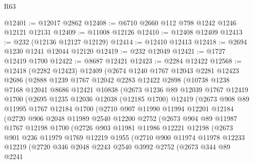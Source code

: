 \begin{lexlean}{R63}
\begin{coremodule}
@12401 := @12017 @2862
@12408 := @6710 @2660 @112 @798 @1242 @1246 @12121 @12131
@12409 := @11008 @12126
@12410 := @12408 @12409
@12413 := @232 (@12136 @12127 @12129)
@12414 := @12410 @12413
@12418 := @2694 @1230 @1241 @12044 @12120
@12419 := @232 @12049
@12421 := @1727 @12419 @1700
@12422 := @8687 @12421
@12423 := @2284 @12422
@12568 := @12418
    (@2282 @12423)
    @12409
    (@2674
      @1240
      @1767
      @12043
      @2281
      @12423
      @2686
      (@2888
        @1239
        @1767
        @12042
        @2283
        @12422
        @2898
        (@10738
          @1238
          @7168
          @12041
          @8686
          @12421
          @10838
          (@2673
            @1236
            @89
            @12039
            @1767
            @12419
            @1700
            (@2695
              @1235
              @12036
              @12038
              (@12185 @1700)
              @12419
              (@2673
                @908
                @89
                @11995
                @1767
                @12184
                @1700
                (@2710
                  @907
                  @11990
                  @11994
                  @12201
                  @12184
                  (@2720
                    @906
                    @2048
                    @11989
                    @2540
                    @12200
                    @2752
                    (@2673
                      @904
                      @89
                      @11987
                      @1767
                      @12198
                      @1700
                      (@2726
                        @903
                        @11981
                        @11986
                        @12221
                        @12198
                        (@2673
                          @901
                          @236
                          @11979
                          @1769
                          @12219
                          @1955
                          (@2710
                            @900
                            @11974
                            @11978
                            @12233
                            @12219
                            (@2720
                              @346
                              @2048
                              @2243
                              @2540
                              @3992
                              @2752
                              (@2673
                                @344
                                @89
                                @2241

\end{coremodule}
\end{lexlean}
